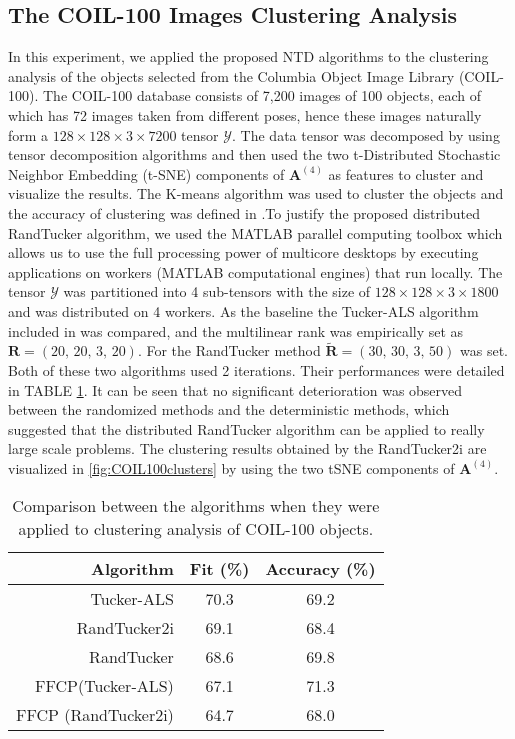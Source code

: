 \documentclass[10pt,twocolumn,twoside]{IEEEtran}
\newcommand{\mat}[1]{\ensuremath{\mathbf{#1}}}
\newcommand{\tensor}[1]{\ensuremath{\boldsymbol{\mathscr{#1}}}}
\newcommand{\matn}[2][n]{\ensuremath{\mathbf{#2}^{(#1)}}}
\begin{document}
\subsection{The COIL-100 Images Clustering Analysis}
In this experiment, we applied the proposed NTD algorithms to the clustering analysis of the objects selected from the Columbia Object Image Library (COIL-100).  The COIL-100 database consists of 7,200 images of 100 objects, each of which has 72 images taken from different poses, hence these images naturally form a $128\times 128 \times 3 \times 7200$ tensor \tensor{Y}. The data tensor was decomposed by using tensor decomposition algorithms and then used the two t-Distributed Stochastic Neighbor Embedding (t-SNE) components of \matn[4]{A} as features to cluster and visualize the results. The K-means algorithm was used to cluster the objects and the accuracy of clustering was defined in  \cite{GNMF2011PAMI}.To justify the proposed distributed RandTucker algorithm, we used the MATLAB parallel computing toolbox which allows us to use the full processing power of multicore desktops by executing applications on workers (MATLAB computational engines) that run locally. The tensor \tensor{Y} was partitioned into 4 sub-tensors with the size of $128\times128\times3\times1800$ and was distributed on 4 workers. As the baseline the Tucker-ALS algorithm included in \cite{KoldaTensorToolbox} was compared, and the multilinear rank was empirically set as $\mat{R}=(20,\,20,\,3,\,20)$. For the RandTucker method $\mat{\tilde{R}}=(30,\,30,\,3,\,50)$ was set. Both of these two algorithms used 2 iterations. Their performances were detailed in TABLE \ref{tab:simuCOIL}. It can be seen that no significant deterioration was observed between the randomized methods and the deterministic methods, which suggested that the distributed RandTucker algorithm can be applied to really large scale problems. The clustering results obtained by the RandTucker2i \figurename are visualized in \figurename \ref{fig:COIL100clusters} by using the two tSNE components of \matn[4]{A}.


\begin{table}
  \caption{Comparison between the algorithms when they were applied to clustering analysis of COIL-100 objects.}
  \label{tab:simuCOIL}
  \centering
  \begin{tabular}{ r  c c } \hline \hline
  Algorithm & Fit (\%) & Accuracy (\%) \\ \hline
 Tucker-ALS & 70.3 & 69.2 \\
 RandTucker2i & 69.1 & 68.4 \\
  RandTucker & 68.6 & 69.8 \\
 FFCP(Tucker-ALS) & 67.1 & 71.3 \\
 FFCP (RandTucker2i) & 64.7 & 68.0 \\ 
 \hline \hline
  \end{tabular}
  \end{table}
\end{document}
